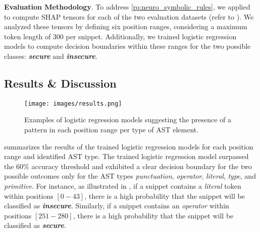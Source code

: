 \textbf{Evaluation Methodology}. To address \ref{rq:neuro_symbolic_rules}, we applied \framework to compute SHAP tensors for each of the two evaluation datasets (refer to ). We analyzed these tensors by defining six position ranges, considering a maximum token length of $300$ per snippet. Additionally, we trained logistic regression models to compute decision boundaries within these ranges for the two possible classes: \textbf{\textit{secure}} and \textbf{\textit{insecure}}.


\subsection{Results \& Discussion}
\label{sec:case_study_results_discussion} 


\begin{figure*}[ht]
		\centering
  \texttt{[image: images/results.png]}
		\caption{Examples of logistic regression models suggesting the presence of a pattern in each position range per type of AST element.}
    \label{fig:rules_examples}
    \vspace{-1em}
\end{figure*}

 summarizes the results of the trained logistic regression models for each position range and identified AST type. The trained logistic regression model surpassed the $60\%$ accuracy threshold and exhibited a clear decision boundary for the two possible outcomes only for the AST types \textit{punctuation}, \textit{operator}, \textit{literal}, \textit{type}, and \textit{primitive}. For instance, as illustrated in , if a snippet contains a \textit{literal} token within positions $[0-43]$, there is a high probability that the snippet will be classified as \textbf{\textit{insecure}}. Similarly, if a snippet contains an \textit{operator} within positions $[251-280]$, there is a high probability that the snippet will be classified as \textbf{\textit{secure}}. 



